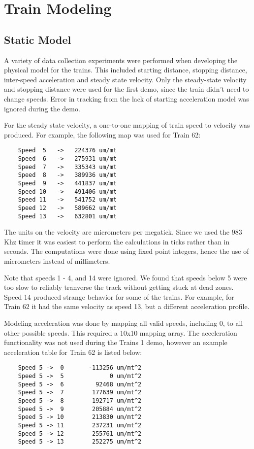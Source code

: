 \documentclass[twoside,a4paper]{refart}
\begin{document}
\section{Train Modeling}

\subsection{Static Model}
A variety of data collection experiments were performed when developing the physical model for the trains. This included starting distance, stopping distance, inter-speed acceleration and steady state velocity. Only the steady-state velocity and stopping distance were used for the first demo, since the train didn't need to change speeds. Error in tracking from the lack of starting acceleration model was ignored during the demo.

For the steady state velocity, a one-to-one mapping of train speed to velocity was produced. For example, the following map was used for Train 62:
\begin{verbatim}
    Speed  5   ->   224376 um/mt
    Speed  6   ->   275931 um/mt
    Speed  7   ->   335343 um/mt
    Speed  8   ->   389936 um/mt
    Speed  9   ->   441837 um/mt
    Speed 10   ->   491406 um/mt
    Speed 11   ->   541752 um/mt
    Speed 12   ->   589662 um/mt
    Speed 13   ->   632801 um/mt
\end{verbatim}

The units on the velocity are micrometers per megatick. Since we used the 983 Khz timer it was easiest to perform the calculations in ticks rather than in seconds. The computations were done using fixed point integers, hence the use of micrometers instead of millimeters.

Note that speeds 1 - 4, and 14 were ignored. We found that speeds below 5 were too slow to reliably tranverse the track without getting stuck at dead zones. Speed 14 produced strange behavior for some of the trains. For example, for Train 62 it had the same velocity as speed 13, but a different acceleration profile.

Modeling acceleration was done by mapping all valid speeds, including 0, to all other possible speeds. This required a 10x10 mapping array. The acceleration functionality was not used during the Trains 1 demo, however an example acceleration table for Train 62 is listed below:

\begin{verbatim}
    Speed 5 ->  0       -113256 um/mt^2
    Speed 5 ->  5             0 um/mt^2
    Speed 5 ->  6         92468 um/mt^2
    Speed 5 ->  7        177639 um/mt^2
    Speed 5 ->  8        192717 um/mt^2
    Speed 5 ->  9        205884 um/mt^2
    Speed 5 -> 10        213830 um/mt^2
    Speed 5 -> 11        237231 um/mt^2
    Speed 5 -> 12        255761 um/mt^2
    Speed 5 -> 13        252275 um/mt^2
\end{verbatim}
\end{document}
